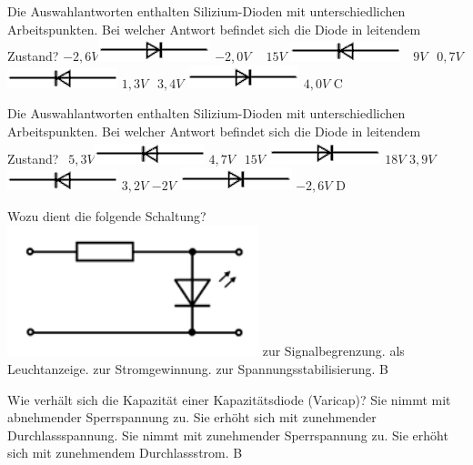 {Die Auswahlantworten enthalten Silizium-Dioden mit unterschiedlichen Arbeitspunkten. Bei welcher Antwort befindet sich die Diode in leitendem Zustand?}%
{$-2,6V $\includegraphics[scale=0.5]{Diode/Bilder/Diode_r.png} $-2,0V$}%
{$~~~~15V$ \includegraphics[scale=0.5]{Diode/Bilder/Diode_l.png} $~~~9V$}%
{$~~0,7V$ \includegraphics[scale=0.5]{Diode/Bilder/Diode_l.png} $1,3V$}%
{$~~3,4V$ \includegraphics[scale=0.5]{Diode/Bilder/Diode_r.png} $4,0V$}%
{C}%

{Die Auswahlantworten enthalten Silizium-Dioden mit unterschiedlichen Arbeitspunkten. Bei welcher Antwort befindet sich die Diode in leitendem Zustand?}%
{$~~5,3V $\includegraphics[scale=0.5]{Diode/Bilder/Diode_l.png} $4,7V$}%
{$~~15V$ \includegraphics[scale=0.5]{Diode/Bilder/Diode_r.png} $18V$}%
{$3,9V$ \includegraphics[scale=0.5]{Diode/Bilder/Diode_l.png} $3,2V$}%
{$-2V$ \includegraphics[scale=0.5]{Diode/Bilder/Diode_r.png} $-2,6V$}%
{D}%

{Wozu dient die folgende Schaltung?\\ \includegraphics[scale=0.63]{Diode/Bilder/TC509.png}}%
{zur Signalbegrenzung.}%
{als Leuchtanzeige.}%
{zur Stromgewinnung.}%
{zur Spannungsstabilisierung.}%
{B}%

{Wie verhält sich die Kapazität einer Kapazitätsdiode (Varicap)?}%
{Sie nimmt mit abnehmender Sperrspannung zu.}%
{Sie erhöht sich mit zunehmender Durchlassspannung.}%
{Sie nimmt mit zunehmender Sperrspannung zu.}%
{Sie erhöht sich mit zunehmendem Durchlassstrom.}%
{B}%
